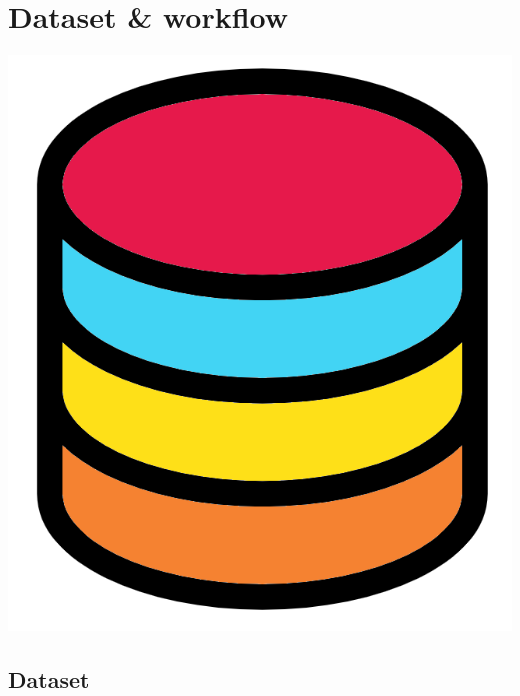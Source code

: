 \documentclass[
]{book}
\begin{document}
\hypertarget{datasetandworkflowchap}{%
\chapter{Dataset \& workflow}\label{datasetandworkflowchap}}

\includegraphics{figures/data.png}

\hypertarget{dataset}{%
\section{Dataset}\label{dataset}}
\end{document}
